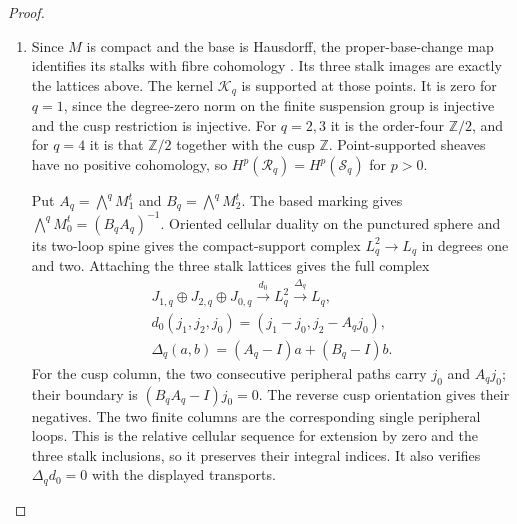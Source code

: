 \documentclass[11pt,a4paper]{article}
\numberwithin{equation}{section}
\theoremstyle{definition}
\begin{document}
\begin{proof}
\begin{enumerate}[label=\arabic*.,leftmargin=*]
\item Since $M$ is compact and the base is Hausdorff, the proper-base-change
map identifies its stalks with fibre cohomology
\cite[Tag 09V5, Lemma 20.18.1; chapter PDF p.~30]{StacksProject}.
Its three stalk images are exactly the lattices above.  The kernel
$\mathcal K_q$ is supported at those points. It is zero for $q=1$,
since the degree-zero norm on the finite suspension group is
injective and the cusp restriction is injective. For $q=2,3$ it is the
order-four $\mathbb Z/2$, and for $q=4$ it is that $\mathbb Z/2$
together with the cusp $\mathbb Z$.
Point-supported sheaves have no positive cohomology, so
$H^p(\mathcal R_q)=H^p(\mathcal S_q)$ for $p>0$.

Put $A_q=\bigwedge^qM_1^t$ and $B_q=\bigwedge^qM_2^t$.
The based marking gives
$\bigwedge^qM_0^t=(B_qA_q)^{-1}$.
Oriented cellular duality on the punctured sphere and its two-loop
spine gives the compact-support complex $L_q^2\to L_q$ in degrees
one and two.  Attaching the three stalk lattices gives the full complex
\[
\begin{gathered}
 J_{1,q}\oplus J_{2,q}\oplus J_{0,q}
 \xrightarrow{d_0}L_q^2\xrightarrow{\Delta_q}L_q,\\
 d_0(j_1,j_2,j_0)=(j_1-j_0,j_2-A_qj_0),\\
 \Delta_q(a,b)=(A_q-I)a+(B_q-I)b.
\end{gathered}
\]
For the cusp column, the two consecutive peripheral paths carry
$j_0$ and $A_qj_0$; their boundary is
$(B_qA_q-I)j_0=0$.  The reverse cusp orientation gives their negatives.
The two finite columns are the corresponding single peripheral
loops.  This is the relative cellular sequence for extension by zero
and the three stalk inclusions, so it preserves their integral indices.
It also verifies $\Delta_qd_0=0$ with the displayed transports.


\end{enumerate}
\end{proof}
\end{document}
